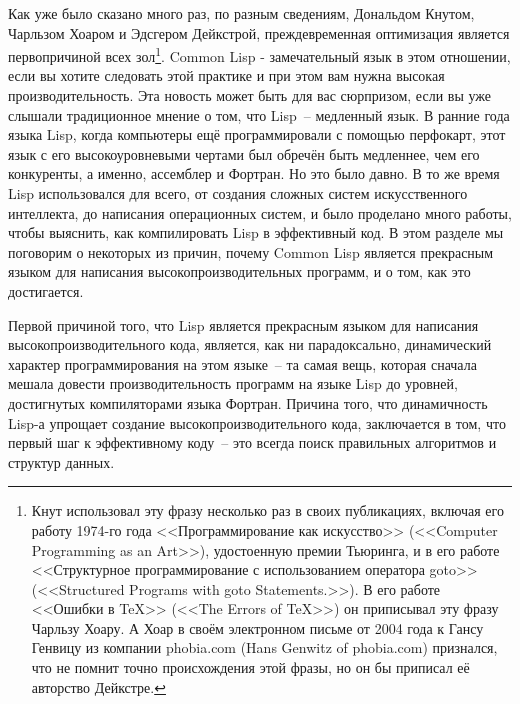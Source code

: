 Как уже было сказано много раз, по разным сведениям, Дональдом Кнутом, Чарльзом Хоаром и
Эдсгером Дейкстрой, преждевременная оптимизация является первопричиной всех
зол\footnote{Кнут использовал эту фразу несколько раз в своих публикациях, включая его
    работу 1974-го года <<Программирование как искусство>> (<<Computer Programming as an
    Art>>), удостоенную премии Тьюринга, и в его работе <<Структурное программирование с
    использованием оператора goto>> (<<Structured Programs with goto Statements.>>). В его
    работе <<Ошибки в TeX>> (<<The Errors of TeX>>) он приписывал эту фразу Чарльзу Хоару.
    А Хоар в своём электронном письме от 2004 года к Гансу Генвицу из компании phobia.com
    (Hans Genwitz of phobia.com) признался, что не помнит точно происхождения этой фразы,
    но он бы приписал её авторство Дейкстре.}. Common Lisp - замечательный язык в этом
    отношении, если вы хотите следовать этой практике и при этом вам нужна высокая
    производительность. Эта новость может быть для вас сюрпризом, если вы уже слышали
    традиционное мнение о том, что Lisp~-- медленный язык. В ранние года языка Lisp,
    когда компьютеры ещё программировали с помощью перфокарт, этот язык с его
    высокоуровневыми чертами был обречён быть медленнее, чем его конкуренты, а именно,
    ассемблер и Фортран. Но это было давно. В то же время Lisp использовался для всего, от
    создания сложных систем искусственного интеллекта, до написания операционных систем, и
    было проделано много работы, чтобы выяснить, как компилировать Lisp в эффективный код.
    В этом разделе мы поговорим о некоторых из причин, почему Common Lisp является
    прекрасным языком для написания высокопроизводительных программ, и о том, как это
    достигается.

Первой причиной того, что Lisp является прекрасным языком для написания
высокопроизводительного кода, является, как ни парадоксально, динамический характер
программирования на этом языке~-- та самая вещь, которая сначала мешала довести
производительность программ на языке Lisp до уровней, достигнутых компиляторами языка
Фортран. Причина того, что динамичность Lisp-а упрощает создание высокопроизводительного
кода, заключается в том, что первый шаг к эффективному коду~-- это всегда поиск
правильных алгоритмов и структур данных.

